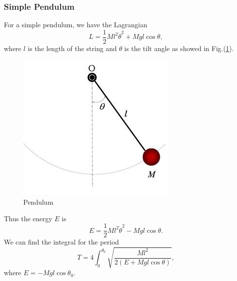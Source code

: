 \documentclass[%
 reprint,
 amsmath,amssymb,
 aps,
]{revtex4-1}
\begin{document}
\subsubsection{Simple Pendulum}
For a simple pendulum, we have the Lagrangian
\begin{equation}
    L=\frac{1}{2}Ml^2\dot{\theta}^2+Mgl\cos{\theta},
\end{equation}
where $l$ is the length of the string and $\theta$ is the tilt angle as showed in Fig.(\ref{fig1}).
\begin{figure}
    \centering
    \includegraphics[scale=0.5]{pendulum.jpg}
    \caption{Pendulum}
    \label{fig1}
\end{figure}
Thus the energy $E$ is
\begin{equation}
     E=\frac{1}{2}Ml^2\dot{\theta}^2-Mgl\cos{\theta}.
\end{equation}
We can find the integral for the period
\begin{equation}
    T=4\int_0^{\theta_0}\sqrt{\frac{Ml^2}{2(E+Mgl\cos{\theta})}},
\label{Eq6}
\end{equation}
where $E=-Mgl\cos{\theta_0}$.
\end{document}
